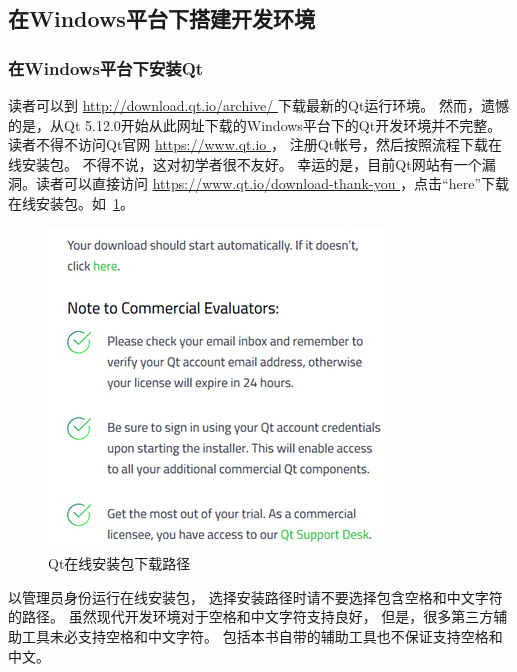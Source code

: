 ﻿




%

\FloatBarrier
\subsection{
在Windows平台下搭建开发环境
}\label{s000110}


\FloatBarrier
\subsubsection{
在Windows平台下安装Qt
}\label{ss000110}


读者可以到 \url{http://download.qt.io/archive/
}
下载最新的Qt运行环境。
然而，遗憾的是，从Qt 5.12.0开始从此网址下载的Windows平台下的Qt开发环境并不完整。
读者不得不访问Qt官网 \url{https://www.qt.io
}，
注册Qt帐号，然后按照流程下载在线安装包。
不得不说，这对初学者很不友好。
幸运的是，目前Qt网站有一个漏洞。读者可以直接访问
 \url{https://www.qt.io/download-thank-you
}，点击“here”下载在线安装包。如\figurename\ \ref{p000000}。
\begin{figure}[htb] %
\marginnote{\fbox{\scriptsize{\kaishu\figurename\,}\footnotesize{\ref{p000000}}}}\centering %
\includegraphics[scale=0.95]{chapter01/images/windows_download_here.png} %
\caption{Qt在线安装包下载路径} %
\label{p000000} %
\end{figure}

以管理员身份运行在线安装包，
选择安装路径时请不要选择包含空格和中文字符的路径。
虽然现代开发环境对于空格和中文字符支持良好，
但是，很多第三方辅助工具未必支持空格和中文字符。
包括本书自带的辅助工具也不保证支持空格和中文。

